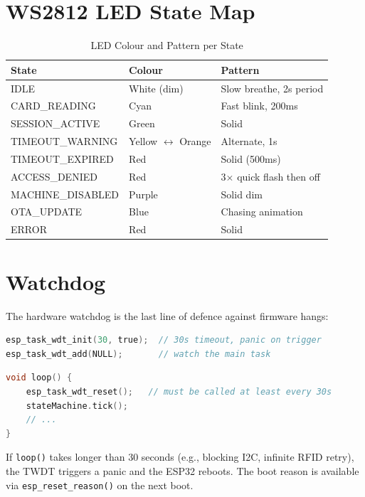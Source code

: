 \section{WS2812 LED State Map}

\begin{table}[H]
\centering
\caption{LED Colour and Pattern per State}
\begin{tabular}{L{3.5cm}L{3cm}L{7cm}}
\toprule
\textbf{State} & \textbf{Colour} & \textbf{Pattern} \\
\midrule
IDLE & White (dim) & Slow breathe, 2s period \\
CARD\_READING & Cyan & Fast blink, 200ms \\
SESSION\_ACTIVE & Green & Solid \\
TIMEOUT\_WARNING & Yellow $\leftrightarrow$ Orange & Alternate, 1s \\
TIMEOUT\_EXPIRED & Red & Solid (500ms) \\
ACCESS\_DENIED & Red & 3$\times$ quick flash then off \\
MACHINE\_DISABLED & Purple & Solid dim \\
OTA\_UPDATE & Blue & Chasing animation \\
ERROR & Red & Solid \\
\bottomrule
\end{tabular}
\end{table}

\section{Watchdog}

The hardware watchdog is the last line of defence against firmware hangs:

\begin{lstlisting}[language=C,caption={Watchdog initialisation in setup()}]
esp_task_wdt_init(30, true);  // 30s timeout, panic on trigger
esp_task_wdt_add(NULL);       // watch the main task
\end{lstlisting}

\begin{lstlisting}[language=C,caption={Watchdog feed in main loop}]
void loop() {
    esp_task_wdt_reset();   // must be called at least every 30s
    stateMachine.tick();
    // ...
}
\end{lstlisting}

If \texttt{loop()} takes longer than 30 seconds (e.g., blocking I2C, infinite RFID retry), the TWDT triggers a panic and the ESP32 reboots. The boot reason is available via \texttt{esp\_reset\_reason()} on the next boot.
